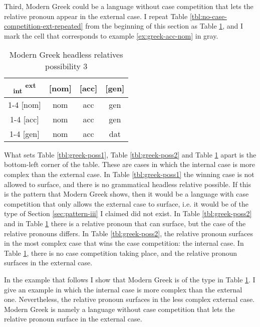 Third, Modern Greek could be a language without case competition that lets the relative pronoun appear in the external case. I repeat Table \ref{tbl:no-case-competition-ext-repeated} from the beginning of this section as Table \ref{tbl:greek-poss3}, and I mark the cell that corresponds to example \ref{ex:greek-acc-nom} in gray.

 \begin{table}[H]
   \center
   \caption{Modern Greek headless relatives possibility 3}
   \begin{tabular}{c|c|c|c}
     \toprule
    \textsubscript{\ac{int}} \textsuperscript{\ac{ext}}
           & [\ac{nom}]
           & [\ac{acc}]
           & [\ac{gen}]
           \\ \cmidrule{1-4}
       [\ac{nom}]
           & \ac{nom}
           & \cellcolor{LG}\ac{acc}
           & \ac{gen}
           \\ \cmidrule{1-4}
       [\ac{acc}]
           & \ac{nom}
           & \ac{acc}
           & \ac{gen}
           \\ \cmidrule{1-4}
       [\ac{gen}]
           & \ac{nom}
           & \ac{acc}
           & \ac{dat}
           \\
     \bottomrule
   \end{tabular}
   \label{tbl:greek-poss3}
 \end{table}

What sets Table \ref{tbl:greek-poss1}, Table \ref{tbl:greek-poss2} and Table \ref{tbl:greek-poss3} apart is the bottom-left corner of the table. These are cases in which the internal case is more complex than the external case.
In Table \ref{tbl:greek-poss1} the winning case is not allowed to surface, and there is no grammatical headless relative possible. If this is the pattern that Modern Greek shows, then it would be a language with case competition that only allows the external case to surface, i.e. it would be of the type of Section \ref{sec:pattern-iii} I claimed did not exist.
In Table \ref{tbl:greek-poss2} and in Table \ref{tbl:greek-poss3} there is a relative pronoun that can surface, but the case of the relative pronouns differs. In Table \ref{tbl:greek-poss2}, the relative pronoun surfaces in the most complex case that wins the case competition: the internal case. In Table \ref{tbl:greek-poss3}, there is no case competition taking place, and the relative pronoun surfaces in the external case.

In the example that follows I show that Modern Greek is of the type in Table \ref{tbl:greek-poss3}. I give an example in which the internal case is more complex than the external one. Nevertheless, the relative pronoun surfaces in the less complex external case. Modern Greek is namely a language without case competition that lets the relative pronoun surface in the external case.

